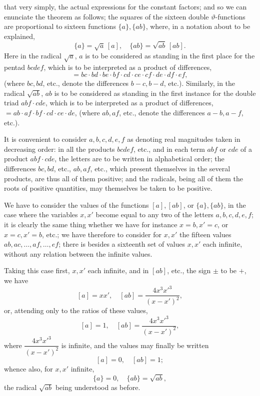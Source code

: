 \documentclass[11pt,a4paper]{article}
\begin{document}
\newpage


\noindent that very simply, the actual expressions for the constant factors; and so we can enunciate the theorem as follows; the squares of the sixteen double $\vartheta$-functions are proportional to sixteen functions $\{a\}, \{ab\}$, where, in a notation about to be explained,
\[
\{a\} = \sqrt{a}\,[a],\quad \{ab\} = \sqrt{ab}\,[ab].
\]
Here in the radical $\sqrt{a}$, $a$ is to be considered as standing in the first place for the pentad $bcdef$, which is to be interpreted as a product of differences,
\[
= bc \cdot bd \cdot be \cdot bf \cdot cd \cdot ce \cdot cf \cdot de \cdot df \cdot ef,
\]
(where $bc, bd$, etc., denote the differences $b - c, b - d$, etc.). Similarly, in the radical $\sqrt{ab}$, $ab$ is to be considered as standing in the first instance for the double triad $abf \cdot cde$, which is to be interpreted as a product of differences, $= ab \cdot af \cdot bf \cdot cd \cdot ce \cdot de$, (where $ab, af$, etc., denote the differences $a - b, a - f$, etc.).

\medskip

It is convenient to consider $a, b, c, d, e, f$ as denoting real magnitudes taken in decreasing order: in all the products $bcdef$, etc., and in each term $abf$ or $cde$ of a product $abf \cdot cde$, the letters are to be written in alphabetical order; the differences $bc, bd$, etc., $ab, af$, etc., which present themselves in the several products, are thus all of them positive; and the radicals, being all of them the roots of positive quantities, may themselves be taken to be positive.

\medskip

We have to consider the values of the functions $[a], [ab]$, or $\{a\}, \{ab\}$, in the case where the variables $x, x'$ become equal to any two of the letters $a, b, c, d, e, f$; it is clearly the same thing whether we have for instance $x = b, x' = c$, or $x = c, x' = b$, etc.; we have therefore to consider for $x, x'$ the fifteen values $ab, ac, \ldots, af, \ldots, ef$; there is besides a sixteenth set of values $x, x'$ each infinite, without any relation between the infinite values.

\medskip

Taking this case first, $x, x'$ each infinite, and in $[ab]$, etc., the sign $\pm$ to be $+$, we have
\[
[a] = xx',\quad [ab] = \frac{4x^{3}x'^{3}}{(x - x')^{2}},
\]
or, attending only to the ratios of these values,
\[
[a] = 1,\quad [ab] = \frac{4x^{3}x'^{3}}{(x - x')^{2}},
\]
where $\dfrac{4x^{3}x'^{3}}{(x - x')^{2}}$ is infinite, and the values may finally be written
\[
[a] = 0,\quad [ab] = 1;
\]
whence also, for $x, x'$ infinite,
\[
\{a\} = 0,\quad \{ab\} = \sqrt{ab},
\]
the radical $\sqrt{ab}$ being understood as before.
\end{document}
